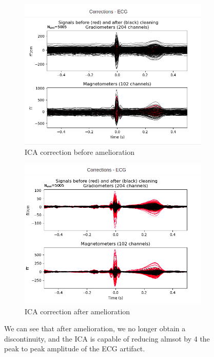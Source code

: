 \begin{figure}
    \centering
    \begin{subfigure}{.5\textwidth}
        \centering
        \includegraphics[width=1.\linewidth]{images_report/preprocessing/ica/ECG_ICA_before_PR.png}
        \caption{ICA correction before amelioration}
        \label{fig:before_ica_PR}
    \end{subfigure}%
    \begin{subfigure}{.5\textwidth}
        \centering
        \includegraphics[width=1.\linewidth]{images_report/preprocessing/ica/ECG_ICA_after_PR.png}
        \caption{ICA correction after amelioration}
        \label{fig:after_ica_PR}
    \end{subfigure}
    \caption{We can see that after amelioration, we no longer obtain a discontinuity, and the ICA is capable of reducing almsot by 4 the peak to peak amplitude of the ECG artifact.}
    \label{fig:PR_ica}
\end{figure}



